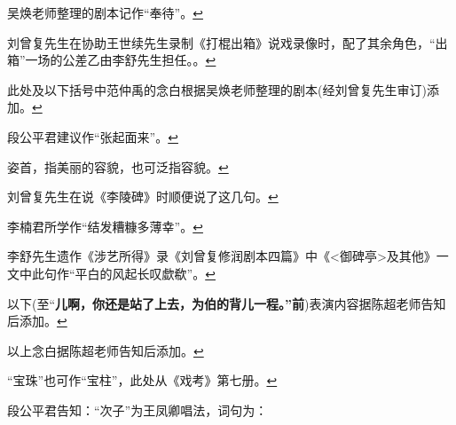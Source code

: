 \item
  \leavevmode\hypertarget{fn491}{}%
  吴焕老师整理的剧本记作``奉待''。\protect\hyperlink{fnref491}{↩}
\item
  \leavevmode\hypertarget{fn492}{}%
  刘曾复先生在协助王世续先生录制《打棍出箱》说戏录像时，配了其余角色，``出箱''一场的公差乙由李舒先生担任。。\protect\hyperlink{fnref492}{↩}
\item
  \leavevmode\hypertarget{fn493}{}%
  此处及以下括号中范仲禹的念白根据吴焕老师整理的剧本(经刘曾复先生审订)添加。\protect\hyperlink{fnref493}{↩}
\item
  \leavevmode\hypertarget{fn494}{}%
  段公平君建议作``张起面来''。\protect\hyperlink{fnref494}{↩}
\item
  \leavevmode\hypertarget{fn495}{}%
  姿首，指美丽的容貌，也可泛指容貌。\protect\hyperlink{fnref495}{↩}
\item
  \leavevmode\hypertarget{fn496}{}%
  刘曾复先生在说《李陵碑》时顺便说了这几句。\protect\hyperlink{fnref496}{↩}
\item
  \leavevmode\hypertarget{fn497}{}%
  李楠君所学作``结发糟糠多薄幸''。\protect\hyperlink{fnref497}{↩}
\item
  \leavevmode\hypertarget{fn498}{}%
  李舒先生遗作《涉艺所得》录《刘曾复修润剧本四篇》中《\textless{}御碑亭\textgreater{}及其他》一文中此句作``平白的风起长叹歔欷''。\protect\hyperlink{fnref498}{↩}
\item
  \leavevmode\hypertarget{fn499}{}%
  以下(至``\textbf{儿啊，你还是站了上去，为伯的背儿一程。''前})表演内容据陈超老师告知后添加。\protect\hyperlink{fnref499}{↩}
\item
  \leavevmode\hypertarget{fn500}{}%
  以上念白据陈超老师告知后添加。\protect\hyperlink{fnref500}{↩}
\item
  \leavevmode\hypertarget{fn501}{}%
  ``宝珠''也可作``宝柱''，此处从《戏考》第七册。\protect\hyperlink{fnref501}{↩}
\item
  \leavevmode\hypertarget{fn502}{}%
  段公平君告知：``次子''为王凤卿唱法，词句为：

